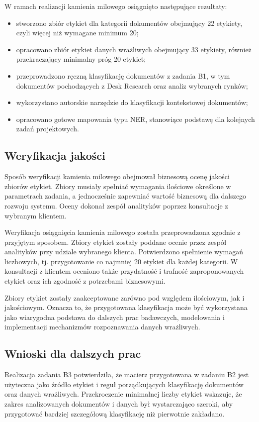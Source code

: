 \documentclass[12pt,a4paper]{report}
\begin{document}
W ramach realizacji kamienia milowego osiągnięto następujące rezultaty:

\begin{itemize}
    \item stworzono zbiór etykiet dla kategorii dokumentów obejmujący 22 etykiety, czyli więcej niż wymagane minimum 20;
    \item opracowano zbiór etykiet danych wrażliwych obejmujący 33 etykiety, również przekraczający minimalny próg 20 etykiet;
    \item przeprowadzono ręczną klasyfikację dokumentów z zadania B1, w tym dokumentów pochodzących z Desk Research oraz analiz wybranych rynków;
    \item wykorzystano autorskie narzędzie do klasyfikacji kontekstowej dokumentów;
    \item opracowano gotowe mapowania typu NER, stanowiące podstawę dla kolejnych zadań projektowych.
\end{itemize}

\subsection{Weryfikacja jakości}
Sposób weryfikacji kamienia milowego obejmował biznesową ocenę jakości zbiorów etykiet. Zbiory musiały spełniać wymagania ilościowe określone w parametrach zadania, a jednocześnie zapewniać wartość biznesową dla dalszego rozwoju systemu. Oceny dokonał zespół analityków poprzez konsultacje z wybranym klientem.

Weryfikacja osiągnięcia kamienia milowego została przeprowadzona zgodnie z przyjętym sposobem. Zbiory etykiet zostały poddane ocenie przez zespół analityków przy udziale wybranego klienta. Potwierdzono spełnienie wymagań liczbowych, tj. przygotowanie co najmniej 20 etykiet dla każdej kategorii. W konsultacji z klientem oceniono także przydatność i trafność zaproponowanych etykiet oraz ich zgodność z potrzebami biznesowymi.

Zbiory etykiet zostały zaakceptowane zarówno pod względem ilościowym, jak i jakościowym. Oznacza to, że przygotowana klasyfikacja może być wykorzystana jako wiarygodna podstawa do dalszych prac badawczych, modelowania i implementacji mechanizmów rozpoznawania danych wrażliwych.

\subsection{Wnioski dla dalszych prac}
Realizacja zadania B3 potwierdziła, że macierz przygotowana w zadaniu B2 jest użyteczna jako źródło etykiet i reguł porządkujących klasyfikację dokumentów oraz danych wrażliwych. Przekroczenie minimalnej liczby etykiet wskazuje, że zakres analizowanych dokumentów i danych był wystarczająco szeroki, aby przygotować bardziej szczegółową klasyfikację niż pierwotnie zakładano.
\end{document}
